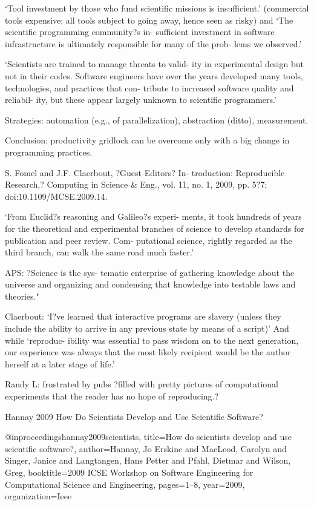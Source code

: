 \documentclass[12pt]{amsart}
\begin{document}
`Tool investment by those who fund scientific missions is insufficient.' (commercial tools expensive; all tools subject to going away, hence seen as risky) and `The scientific programming community?s in- sufficient investment in software infrastructure is ultimately responsible for many of the prob- lems we observed.'

`Scientists are trained to manage threats to valid- ity in experimental design but not in their codes. Software engineers have over the years developed many tools, technologies, and practices that con- tribute to increased software quality and reliabil- ity, but these appear largely unknown to scientific programmers.'

Strategies: automation (e.g., of parallelization), abstraction (ditto), measurement.

Conclusion: productivity gridlock can be overcome only with a big change in programming practices.



S. Fomel and J.F. Claerbout, ?Guest Editors? In- troduction: Reproducible Research,? Computing in Science \& Eng., vol. 11, no. 1, 2009, pp. 5?7; doi:10.1109/MCSE.2009.14.

`From Euclid?s reasoning and Galileo?s experi- ments, it took hundreds of years for the theoretical and experimental branches of science to develop standards for publication and peer review. Com- putational science, rightly regarded as the third
branch, can walk the same road much faster.'

APS: ?Science is the sys- tematic enterprise of gathering knowledge about the universe and organizing and condensing that knowledge into testable laws and theories."

Claerbout: `I?ve learned that interactive programs are slavery (unless they include the ability to arrive in any previous state by means of a script)' And while `reproduc- ibility was essential to pass wisdom on to the next generation, our experience was always that the most likely recipient would be the author herself at a later stage of life.'

Randy L: frustrated by pubs ?filled with pretty pictures of computational experiments that the reader has no hope of reproducing.?



Hannay 2009 How Do Scientists Develop and Use Scientific Software?

@inproceedings{hannay2009scientists,
  title={How do scientists develop and use scientific software?},
  author={Hannay, Jo Erskine and MacLeod, Carolyn and Singer, Janice and Langtangen, Hans Petter and Pfahl, Dietmar and Wilson, Greg},
  booktitle={2009 ICSE Workshop on Software Engineering for Computational Science and Engineering},
  pages={1--8},
  year={2009},
  organization={Ieee}
}
\end{document}
